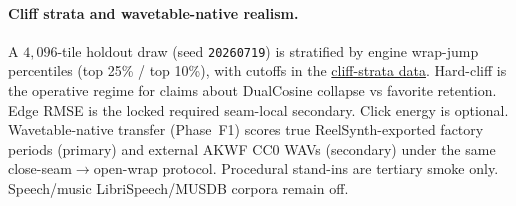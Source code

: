 \paragraph{Cliff strata and wavetable-native realism.}
A $4{,}096$-tile holdout draw (seed \texttt{20260719}) is stratified by engine wrap-jump percentiles (top 25\% / top 10\%), with cutoffs in the \href{https://github.com/reeldemo/denoise-opt-meta/blob/master/paper/Unsupervised_Wavetable_Seam_Artifact_Repair_via_Hybrid_GA-PPO_Meta-Search_v11/figures/cliff_strata.json}{cliff-strata data}.
Hard-cliff is the operative regime for claims about DualCosine collapse vs favorite retention.
Edge RMSE is the locked required seam-local secondary. Click energy is optional.
Wavetable-native transfer (Phase~F1) scores true ReelSynth-exported factory periods (primary) and external AKWF CC0 WAVs (secondary) under the same close-seam$\to$open-wrap protocol.
Procedural stand-ins are tertiary smoke only.
Speech/music LibriSpeech/MUSDB corpora remain off.


